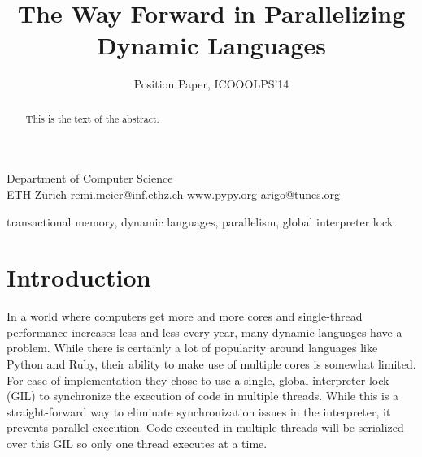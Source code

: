 \documentclass{sigplanconf}
\begin{document}
\setlength{\pdfpageheight}{\paperheight}
\setlength{\pdfpagewidth}{\paperwidth}






\title{The Way Forward in Parallelizing Dynamic Languages}
\subtitle{Position Paper, ICOOOLPS'14}

           {Department of Computer Science\\ ETH Zürich}
           {remi.meier@inf.ethz.ch}
           {www.pypy.org}
           {arigo@tunes.org}

\maketitle

\begin{abstract}
This is the text of the abstract.
\end{abstract}



\keywords
transactional memory, dynamic languages, parallelism, global interpreter lock

\section{Introduction}
In a world where computers get more and more cores and single-thread
performance increases less and less every year, many dynamic languages
have a problem. While there is certainly a lot of popularity around
languages like Python and Ruby, their ability to make use of multiple
cores is somewhat limited. For ease of implementation they chose to
use a single, global interpreter lock (GIL) to synchronize the
execution of code in multiple threads. While this is a
straight-forward way to eliminate synchronization issues in the
interpreter, it prevents parallel execution. Code executed in multiple
threads will be serialized over this GIL so only one thread executes
at a time.
\end{document}
